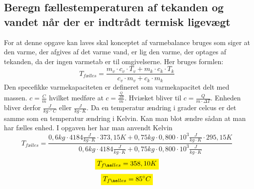 \subsection{Beregn fællestemperaturen af tekanden og vandet når der er indtrådt termisk ligevægt}
For at denne opgave kan laves skal konceptet af varmebalance bruges som siger at den varme, der afgives af 
det varme vand, er lig den varme, der optages af tekanden, da der ingen varmetab er til omgivelserne. Her 
bruges formlen:
\begin{equation*}
    T_{fælles}= \frac{m_v \cdot c_v \cdot T_v + m_k \cdot c_k \cdot T_k}{c_v \cdot m_v + c_k \cdot m_k}
\end{equation*} %
Den specefikke varmekapaciteten er defineret som varmekapacitet delt med massen. \begin{math}c = \frac{C}{m}\end{math} hvilket medføre at \begin{math}c = \frac{\frac{Q}{\Delta T}}{m}\end{math}. Hviæket bliver til \begin{math}c = \frac{Q}{m \cdot \Delta T}\end{math}. Enheden bliver derfor \begin{math}\frac{J}{kg \cdot ^{\circ}C}\end{math} eller \begin{math}\frac{J}{kg \cdot K}\end{math}. Da en temperatur ændring i grader celcus er det samme som en temperatur ændring i Kelvin. Kan man blot ændre sådan at man har fælles enhed. I opgaven her har man anvendt Kelvin
\begin{equation*}
    T_{fælles}= \frac{0,6 kg \cdot 4184 \frac{J}{kg \cdot  K} \cdot 373,15 K + 0,75 kg \cdot 0,800 \cdot 10^3 \frac{J}{kg \cdot K} \cdot 295,15K}{0,6 kg \cdot 4184 \frac{J}{kg \cdot K} + 0,75 kg \cdot 0,800 \cdot 10^3 \frac{J}{kg \cdot K}}     
\end{equation*}
\begin{equation*}
    \mathcolorbox{yellow}{T_{fælles}= 358,10 K}
\end{equation*}
\begin{equation*}
\mathcolorbox{yellow}{T_{fælles}= 85^{\circ}C}
\end{equation*}

	 
    
